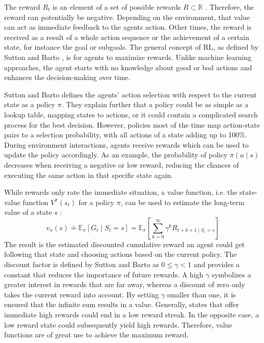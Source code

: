 The reward $R_t$ is an element of a set of possible rewards $R \subset \mathbb{R}$ \cite{suba18}. Therefore, the reward can potentially be negative. Depending on the environment, that value can act as immediate feedback to the agents action. Other times, the reward is received as a result of a whole action sequence or the achievement of a certain state, for instance the goal or subgoals. The general concept of RL, as defined by Sutton and Barto \cite{suba18}, is for agents to maximize rewards. Unlike machine learning approaches, the agent starts with no knowledge about good or bad actions and enhances the decision-making over time.

Sutton and Barto defines the agents' action selection with respect to the current state as a policy $\pi$. They explain further that a policy could be as simple as a lookup table, mapping states to actions, or it could contain a complicated search process for the best decision. However, policies most of the time map action-state pairs to a selection probability, with all actions of a state adding up to 100\%.
During environment interactions, agents receive rewards which can be used to update the policy accordingly. As an example, the probability of policy $\pi(a \mid s)$ decreases when receiving a negative or low reward, reducing the chances of executing the same action in that specific state again.

While rewards only rate the immediate situation, a value function, i.e. the state-value function $V^\pi(s_t)$ for a policy $\pi$, can be used to estimate the long-term value of a state $s$ \cite{suba18}:
\begin{equation}\label{eq:value_func}
    v_\pi(s) \doteq \mathbb{E}_\pi \left[ G_t \mid S_t = s \right] = \mathbb{E}_\pi \left[ \sum^{\infty}_{k=0} \gamma^k R_{t+k+1 \mid S_t = s}  \right]
\end{equation}
The result is the estimated discounted cumulative reward an agent could get following that state and choosing actions based on the current policy. The discount factor is defined by Sutton and Barto as $0 \le \gamma < 1$ and provides a constant that reduces the importance of future rewards. A high $\gamma$ symbolizes a greater interest in rewards that are far away, whereas a discount of zero only takes the current reward into account. By setting $\gamma$ smaller than one, it is ensured that the infinite sum results in a value. Generally, states that offer immediate high rewards could end in a low reward streak. In the opposite case, a low reward state could subsequently yield high rewards. Therefore, value functions are of great use to achieve the maximum reward.

